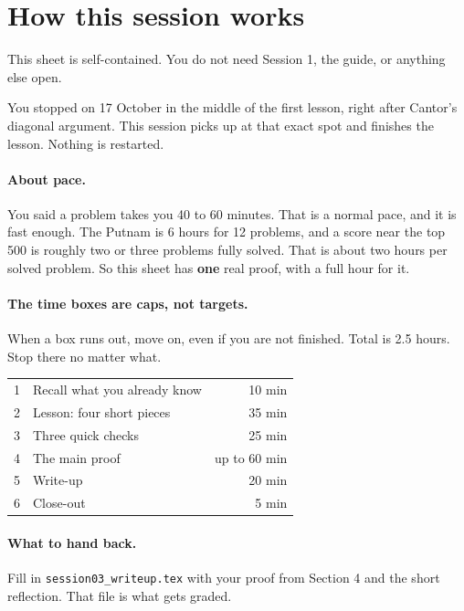 \documentclass[11pt]{article}
\theoremstyle{plain}
\theoremstyle{definition}
\begin{document}

\section*{How this session works}

This sheet is self-contained. You do not need Session 1, the guide, or anything else open.

You stopped on 17 October in the middle of the first lesson, right after Cantor's diagonal argument. This session picks up at that exact spot and finishes the lesson. Nothing is restarted.

\paragraph{About pace.} You said a problem takes you 40 to 60 minutes. That is a normal pace, and it is fast enough. The Putnam is 6 hours for 12 problems, and a score near the top 500 is roughly two or three problems fully solved. That is about two hours per solved problem. So this sheet has \textbf{one} real proof, with a full hour for it.

\paragraph{The time boxes are caps, not targets.} When a box runs out, move on, even if you are not finished. Total is 2.5 hours. Stop there no matter what.

\medskip
\begin{center}
\begin{tabular}{llr}
\hline
1 & Recall what you already know & 10 min \\
2 & Lesson: four short pieces & 35 min \\
3 & Three quick checks & 25 min \\
4 & The main proof & up to 60 min \\
5 & Write-up & 20 min \\
6 & Close-out & 5 min \\
\hline
\end{tabular}
\end{center}

\paragraph{What to hand back.} Fill in \texttt{session03\_writeup.tex} with your proof from Section 4 and the short reflection. That file is what gets graded.
\end{document}

